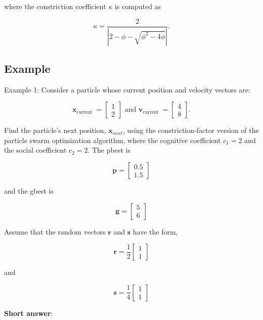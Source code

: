 where the constriction coefficient \(\kappa\) is computed as

\[
	\kappa=\frac{2}{\left|2-\phi-\sqrt{\phi^{2}-4 \phi}\right|}.
\]

\subsection{Example}
Example 1: Consider a particle whose current position and velocity vectors are:

\[
	\boldsymbol{x}_{\text {current }}=\left[\begin{array}{l}
		1 \\
		2
	\end{array}\right] \text { and } \boldsymbol{v}_{\text {current }}=\left[\begin{array}{l}
		4 \\
		8
	\end{array}\right] .
\]

Find the particle's next position, \(\boldsymbol{x}_{n e x t}\), using the constriction-factor version of the particle swarm optimization algorithm, where the cognitive coefficient \(c_{1}=2\) and the social coefficient \(c_{2}=2\). The pbest is

\[
	\boldsymbol{p}=\left[\begin{array}{l}
		0.5 \\
		1.5
	\end{array}\right]
\]

and the gbest is

\[
	\boldsymbol{g}=\left[\begin{array}{l}
		5 \\
		6
	\end{array}\right]
\]

Assume that the random vectors \(\boldsymbol{r}\) and \(\boldsymbol{s}\) have the form,

\[
	\boldsymbol{r}=\frac{1}{2}\left[\begin{array}{l}
		1 \\
		1
	\end{array}\right]
\]

and

\[
	\boldsymbol{s}=\frac{1}{4}\left[\begin{array}{l}
		1 \\
		1
	\end{array}\right]
\]

\textbf{Short answer}:


